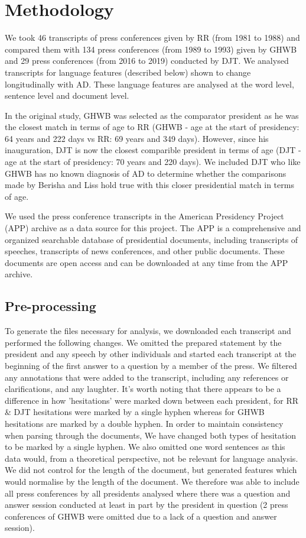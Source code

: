 \documentclass[12pt]{article}
\begin{document}
\section{Methodology}\label{methodology}
We took 46 transcripts of press conferences given by RR (from 1981 to 1988) and compared them with 134 press conferences (from 1989 to 1993) given by GHWB and 29 press conferences (from 2016 to 2019) conducted by DJT.  We analysed transcripts for language features (described below) shown to change longitudinally with AD. These language features are analysed at the word level, sentence level and document level. 
\par 
In the original study, GHWB was selected as the comparator president as he was the closest match in terms of age to RR (GHWB - age at the start of presidency: 64 years and 222 days vs RR: 69 years and 349 days). However, since his inauguration, DJT is now the closest comparible president in terms of age (DJT - age at the start of presidency: 70 years and 220 days). We included DJT who like GHWB has no known diagnosis of AD to determine whether the comparisons made by Berisha and Liss hold true with this closer presidential match in terms of age. 
\par 
We used the press conference transcripts in the American Presidency Project (APP) archive as a data source for this project. The APP is a comprehensive and organized searchable database of presidential documents, including transcripts of speeches, transcripts of news conferences, and other public documents. These documents are open access and can be downloaded at any time from the APP archive.

\subsection{Pre-processing}
To generate the files necessary for analysis, we downloaded each transcript and performed the following changes. We omitted the prepared statement by the president and any speech by other individuals and started each transcript at the beginning of the first answer to a question by a member of the press. We filtered any annotations that were added to the transcript, including any references or clarifications, and any laughter. It's worth noting that there appears to be a difference in how 'hesitations' were marked down between each president, for RR \& DJT hesitations were marked by a single hyphen whereas for GHWB hesitations are marked by a double hyphen. In order to maintain consistency when parsing through the documents, We have changed both types of hesitation to be marked by a single hyphen. We also omitted one word sentences as this data would, from a theoretical perspective, not be relevant for language analysis. We did not control for the length of the document, but generated features which would normalise by the length of the document. We therefore was able to include all press conferences by all presidents analysed where there was a question and answer session conducted at least in part by the president in question (2 press conferences of GHWB were omitted due to a lack of a question and answer session).
\end{document}
